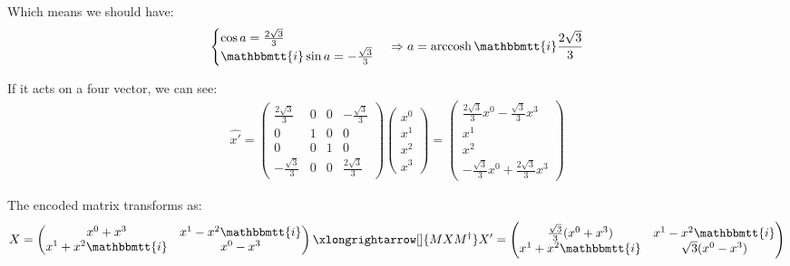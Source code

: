\documentclass[]{ctexart}
\newcommand{\mi}{\mathbbmtt{i}}
\DeclareMathOperator{\arccosh}{arccosh}
\begin{document}
			Which means we should have:
				\begin{equation*}
				\begin{aligned}
					\begin{cases}
						\cos a=\frac{2\sqrt{3}}{3}\\
						\mi \sin a=-\frac{\sqrt{3}}{3}
					\end{cases}
					\Rightarrow a=\arccosh \mi \frac{2\sqrt{3}}{3}
				\end{aligned}
				\end{equation*}
			
			If it acts on a four vector, we can see:
				\begin{equation*}
				\begin{aligned}
					\hat{x'}=
					\left(\begin{array}{cccc}
					\frac{2\sqrt{3}}{3} & 0 & 0 & -\frac{\sqrt{3}}{3}\\
					0 & 1 & 0 & 0 \\
					0 & 0 & 1 & 0 \\
					-\frac{\sqrt{3}}{3} & 0 & 0 & \frac{2\sqrt{3}}{3}
					\end{array}\right)
					\begin{pmatrix}
					x^0\\
					x^1\\
					x^2\\
					x^3
					\end{pmatrix}
					=
					\begin{pmatrix}
					\frac{2\sqrt{3}}{3}x^0 -\frac{\sqrt{3}}{3}x^3\\
					x^1\\
					x^2\\
					-\frac{\sqrt{3}}{3}x^0+\frac{2\sqrt{3}}{3}x^3
					\end{pmatrix}
				\end{aligned}
				\end{equation*}
			
			The encoded matrix transforms as:
				\begin{equation*}
				\begin{aligned}
					X=
					\begin{pmatrix}
					x^0+x^3 & x^1-x^2\mi\\
					x^1+x^2\mi & x^0-x^3
					\end{pmatrix}
					\xlongrightarrow[]{MXM^{\dagger}}
					X'=
					\begin{pmatrix}
					\frac{\sqrt{3}}{3}(x^0+x^3) & x^1-x^2\mi\\
					x^1+x^2\mi & \sqrt{3}(x^0-x^3)
					\end{pmatrix}
				\end{aligned}
				\end{equation*}	
			
\end{document}
